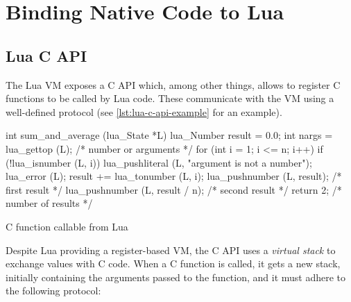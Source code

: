 \section{Binding Native Code to Lua}

\subsection{Lua C API}
	\label{sec:lua-c-api}

The Lua \gls{VM} exposes a C \gls{API} which, among other things, allows to
register C functions to be called by Lua code. These communicate with the VM
using a well-defined protocol (see \autoref{lst:lua-c-api-example}
for an example).

\begin{listing}[htH]
	\begin{ccode}
  int sum_and_average (lua_State *L) {
    lua_Number result = 0.0;
    int nargs = lua_gettop (L); /* number or arguments */
    for (int i = 1; i <= n; i++) {
      if (!lua_isnumber (L, i)) {
        lua_pushliteral (L, "argument is not a number");
        lua_error (L);
      }
      result += lua_tonumber (L, i);
    }
    lua_pushnumber (L, result);        /* first result */
    lua_pushnumber (L, result / n);   /* second result */
    return 2;                     /* number of results */
  }
	\end{ccode}
	\caption{C function callable from Lua}
	\label{lst:lua-c-api-example}
\end{listing}

Despite Lua providing a register-based VM, the C API uses a \emph{virtual
stack} to exchange values with C code. When a C function is called, it gets
a new stack, initially containing the arguments passed to the function, and
it must adhere to the following protocol:

